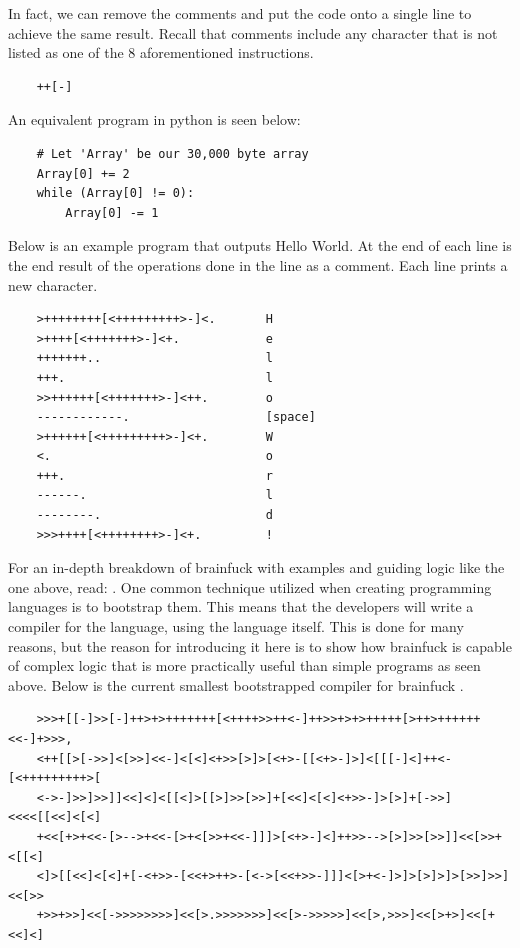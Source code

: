In fact, we can remove the comments and put the code onto a single line to achieve the same result.
Recall that comments include any character that is not listed as one of the 8 aforementioned instructions.

\begin{verbatim}
    ++[-]
\end{verbatim}

\newpage

An equivalent program in python is seen below:

\begin{verbatim}
    # Let 'Array' be our 30,000 byte array
    Array[0] += 2
    while (Array[0] != 0):
        Array[0] -= 1
\end{verbatim}

Below is an example program that outputs Hello World.
At the end of each line is the end result of the operations done in the line as a comment.
Each line prints a new character.

\begin{verbatim}
    >++++++++[<+++++++++>-]<.       H
    >++++[<+++++++>-]<+.            e
    +++++++..                       l
    +++.                            l
    >>++++++[<+++++++>-]<++.        o
    ------------.                   [space]
    >++++++[<+++++++++>-]<+.        W
    <.                              o
    +++.                            r
    ------.                         l
    --------.                       d
    >>>++++[<++++++++>-]<+.         !
\end{verbatim}

For an in-depth breakdown of brainfuck with examples and guiding logic like the one above, read: \cite{BfGH}.
One common technique utilized when creating programming languages is to bootstrap them.
This means that the developers will write a compiler for the language, using the language itself.
This is done for many reasons, but the reason for introducing it here is to show how brainfuck is capable of complex logic that is more practically useful than simple programs as seen above.
Below is the current smallest bootstrapped compiler for brainfuck \cite{SmallestBfCompiler,SmallestBfCompilerActual}.

\begin{verbatim}
    >>>+[[-]>>[-]++>+>+++++++[<++++>>++<-]++>>+>+>+++++[>++>++++++<<-]+>>>,
    <++[[>[->>]<[>>]<<-]<[<]<+>>[>]>[<+>-[[<+>-]>]<[[[-]<]++<-[<+++++++++>[
    <->-]>>]>>]]<<]<]<[[<]>[[>]>>[>>]+[<<]<[<]<+>>-]>[>]+[->>]<<<<[[<<]<[<]
    +<<[+>+<<-[>-->+<<-[>+<[>>+<<-]]]>[<+>-]<]++>>-->[>]>>[>>]]<<[>>+<[[<]
    <]>[[<<]<[<]+[-<+>>-[<<+>++>-[<->[<<+>>-]]]<[>+<-]>]>[>]>]>[>>]>>]<<[>>
    +>>+>>]<<[->>>>>>>>]<<[>.>>>>>>>]<<[>->>>>>]<<[>,>>>]<<[>+>]<<[+<<]<]
\end{verbatim}

